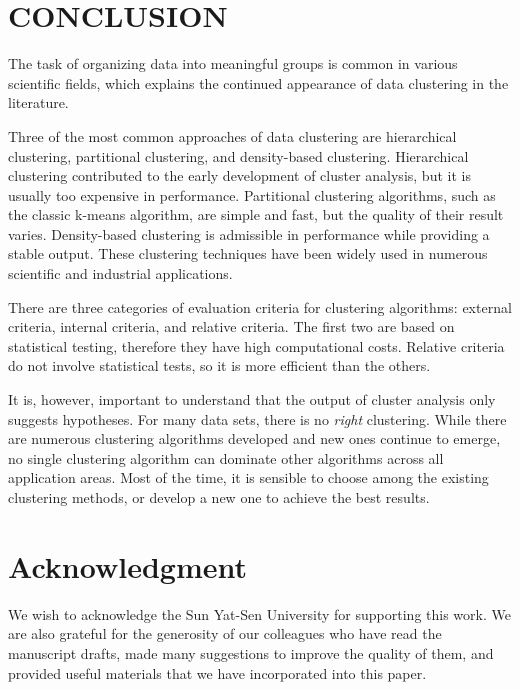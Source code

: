 \documentclass[conference]{IEEEtran}
\begin{document}
\section{CONCLUSION} \label{sec:Conclusion}

The task of organizing data into meaningful groups is common in various scientific fields, which explains the continued appearance of data clustering in the literature. 

Three of the most common approaches of data clustering are hierarchical clustering, partitional clustering, and density-based clustering. Hierarchical clustering contributed to the early development of cluster analysis, but it is usually too expensive in performance. Partitional clustering algorithms, such as the classic k-means algorithm, are simple and fast, but the quality of their result varies. Density-based clustering is admissible in performance while providing a stable output. These clustering techniques have been widely used in numerous scientific and industrial applications.

There are three categories of evaluation criteria for clustering algorithms: external criteria, internal criteria, and relative criteria. The first two are based on statistical testing, therefore they have high computational costs. Relative criteria do not involve statistical tests, so it is more efficient than the others.

It is, however, important to understand that the output of cluster analysis only suggests hypotheses. For many data sets, there is no \textit{right} clustering. While there are numerous clustering algorithms developed and new ones continue to emerge, no single clustering algorithm can dominate other algorithms across all application areas. Most of the time, it is sensible to choose among the existing clustering methods, or develop a new one to achieve the best results.

\section*{Acknowledgment}

We wish to acknowledge the Sun Yat-Sen University for supporting this work. We are also grateful for the generosity of our colleagues who have read the manuscript drafts, made many suggestions to improve the quality of them, and provided useful materials that we have incorporated into this paper. 



\end{document}
